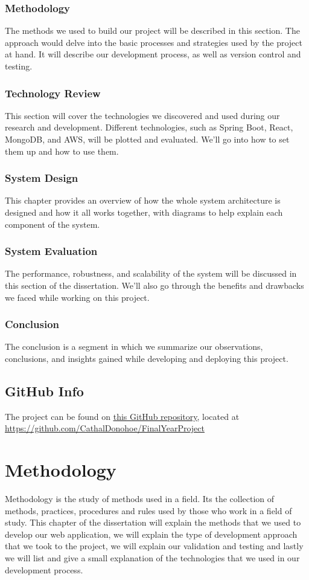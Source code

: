 \subsection{Methodology}
The methods we used to build our project will be described in this section. The approach would delve into the basic processes and strategies used by the project at hand. It will describe our development process, as well as version control and testing.  

\subsection{Technology Review}
This section will cover the technologies we discovered and used during our research and development. Different technologies, such as Spring Boot, React, MongoDB, and AWS, will be plotted and evaluated. We'll go into how to set them up and how to use them. 

\subsection{System Design}
This chapter provides an overview of how the whole system architecture is designed and how it all works together, with diagrams to help explain each component of the system. 

\subsection{System Evaluation}
The performance, robustness, and scalability of the system will be discussed in this section of the dissertation. We'll also go through the benefits and drawbacks we faced while working on this project. 

\subsection{Conclusion}
The conclusion is a segment in which we summarize our observations, conclusions, and insights gained while developing and deploying this project. 

\section{GitHub Info}
The project can be found on \underline{\href{https://github.com/CathalDonohoe/FinalYearProject}{this GitHub repository}}, located at \url{https://github.com/CathalDonohoe/FinalYearProject}

\chapter{Methodology}
Methodology is the study of methods used in a field. Its the collection of methods, practices, procedures and rules used by those who work in a field of study. This chapter of the dissertation will explain the methods that we used to develop our web application, we will explain the type of development approach that we took to the project, we will explain our validation and testing and lastly we will list and give a small explanation of the technologies that we used in our development process.

